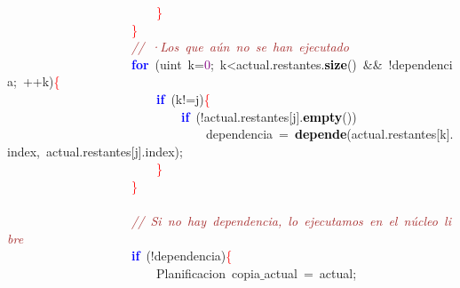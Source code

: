 \mbox{}\ \ \ \ \ \ \ \ \ \ \ \ \ \ \ \ \ \ \ \ \ \ \ \ \textcolor{Red}{\}} \\
\mbox{}\ \ \ \ \ \ \ \ \ \ \ \ \ \ \ \ \ \ \ \ \textcolor{Red}{\}} \\
\mbox{}\ \ \ \ \ \ \ \ \ \ \ \ \ \ \ \ \ \ \ \ \textit{\textcolor{Brown}{//\ ·Los\ que\ aún\ no\ se\ han\ ejecutado}} \\
\mbox{}\ \ \ \ \ \ \ \ \ \ \ \ \ \ \ \ \ \ \ \ \textbf{\textcolor{Blue}{for}}\ \textcolor{BrickRed}{(}\textcolor{TealBlue}{uint}\ k\textcolor{BrickRed}{=}\textcolor{Purple}{0}\textcolor{BrickRed}{;}\ k\textcolor{BrickRed}{\textless{}}actual\textcolor{BrickRed}{.}restantes\textcolor{BrickRed}{.}\textbf{\textcolor{Black}{size}}\textcolor{BrickRed}{()}\ \textcolor{BrickRed}{\&\&}\ \textcolor{BrickRed}{!}dependencia\textcolor{BrickRed}{;}\ \textcolor{BrickRed}{++}k\textcolor{BrickRed}{)}\textcolor{Red}{\{} \\
\mbox{}\ \ \ \ \ \ \ \ \ \ \ \ \ \ \ \ \ \ \ \ \ \ \ \ \textbf{\textcolor{Blue}{if}}\ \textcolor{BrickRed}{(}k\textcolor{BrickRed}{!=}j\textcolor{BrickRed}{)}\textcolor{Red}{\{} \\
\mbox{}\ \ \ \ \ \ \ \ \ \ \ \ \ \ \ \ \ \ \ \ \ \ \ \ \ \ \ \ \textbf{\textcolor{Blue}{if}}\ \textcolor{BrickRed}{(!}actual\textcolor{BrickRed}{.}restantes\textcolor{BrickRed}{[}j\textcolor{BrickRed}{].}\textbf{\textcolor{Black}{empty}}\textcolor{BrickRed}{())} \\
\mbox{}\ \ \ \ \ \ \ \ \ \ \ \ \ \ \ \ \ \ \ \ \ \ \ \ \ \ \ \ \ \ \ \ dependencia\ \textcolor{BrickRed}{=}\ \textbf{\textcolor{Black}{depende}}\textcolor{BrickRed}{(}actual\textcolor{BrickRed}{.}restantes\textcolor{BrickRed}{[}k\textcolor{BrickRed}{].}index\textcolor{BrickRed}{,}\ actual\textcolor{BrickRed}{.}restantes\textcolor{BrickRed}{[}j\textcolor{BrickRed}{].}index\textcolor{BrickRed}{);} \\
\mbox{}\ \ \ \ \ \ \ \ \ \ \ \ \ \ \ \ \ \ \ \ \ \ \ \ \textcolor{Red}{\}} \\
\mbox{}\ \ \ \ \ \ \ \ \ \ \ \ \ \ \ \ \ \ \ \ \textcolor{Red}{\}} \\
\mbox{} \\
\mbox{}\ \ \ \ \ \ \ \ \ \ \ \ \ \ \ \ \ \ \ \ \textit{\textcolor{Brown}{//\ Si\ no\ hay\ dependencia,\ lo\ ejecutamos\ en\ el\ núcleo\ libre}} \\
\mbox{}\ \ \ \ \ \ \ \ \ \ \ \ \ \ \ \ \ \ \ \ \textbf{\textcolor{Blue}{if}}\ \textcolor{BrickRed}{(!}dependencia\textcolor{BrickRed}{)}\textcolor{Red}{\{} \\
\mbox{}\ \ \ \ \ \ \ \ \ \ \ \ \ \ \ \ \ \ \ \ \ \ \ \ \textcolor{TealBlue}{Planificacion}\ copia$\_$actual\ \textcolor{BrickRed}{=}\ actual\textcolor{BrickRed}{;} \\
